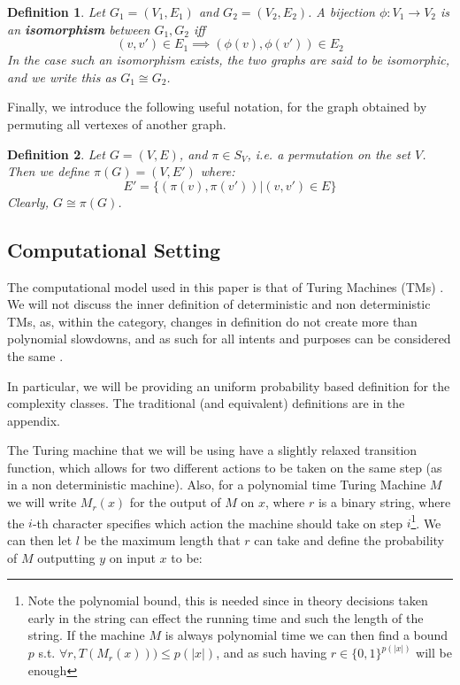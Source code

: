 \documentclass{article}
\newtheorem{definition}{Definition}
\begin{document}
\begin{definition}
    Let $G_1 = (V_1, E_1)$ and $G_2 = (V_2, E_2)$. A bijection $\phi: V_1 \to V_2$ is an \textbf{isomorphism} between $G_1, G_2$ iff 
    \[ (v, v') \in E_1 \implies (\phi(v), \phi(v')) \in E_2 \] 
    In the case such an isomorphism exists, the two graphs are said to be isomorphic, and we write this as $G_1 \cong G_2$. 
\end{definition}

Finally, we introduce the following useful notation, for the graph obtained by permuting all vertexes of another graph.
\begin{definition}
    Let $G = (V, E)$, and $\pi \in S_V$, i.e. a permutation on the set $V$. Then we define $\pi(G) = (V, E')$ where:
    \[ E' = \{ (\pi(v), \pi(v')) | (v, v') \in E \} \]
    Clearly, $G \cong \pi(G)$.
\end{definition}

\subsection{Computational Setting}
The computational model used in this paper is that of Turing Machines (TMs) \cite{turingComputableNumbersApplication1937}. We will not discuss the inner definition of deterministic and non deterministic TMs, as, within the category, changes in definition do not create more than polynomial slowdowns, and as such for all intents and purposes can be considered the same \cite{aroraComputationalComplexityModern2009}. 

In particular, we will be providing an uniform probability based definition for the complexity classes. The traditional (and equivalent) definitions are in the appendix.

The Turing machine that we will be using have a slightly relaxed transition function, which allows for two different actions to be taken on the same step (as in a non deterministic machine). Also, for a polynomial time Turing Machine $M$ we will write $M_r(x)$ for the output of $M$ on $x$, where $r$ is a binary string, where the $i$-th character specifies which action the machine should take on step $i$\footnote{Note the polynomial bound, this is needed since in theory decisions taken early in the string can effect the running time and such the length of the string. If the machine $M$ is always polynomial time we can then find a bound $p$ s.t. $\forall r, T(M_r(x))) \leq p(|x|) $, and as such having $r \in \{0,1\}^{p(|x|)}$ will be enough}. We can then let $l$ be the maximum length that $r$ can take and define the probability of $M$ outputting $y$ on input $x$ to be:
\end{document}
